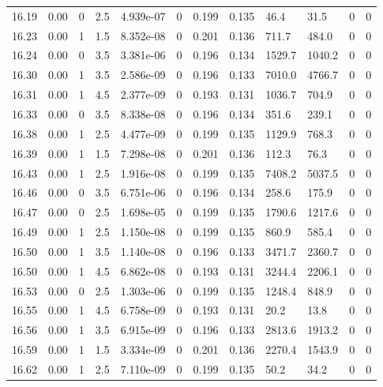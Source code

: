 \documentclass[preview]{standalone}
\begin{document}
{{{{{{{{{{{{{{{{{\begin{tabular}{L{1.2cm}C{1.2cm} C{0.3cm}C{0.5cm} C{1.4cm}C{1.4cm} C{1.4cm}C{1.4cm} C{1.6cm}C{1.6cm} C{1.6cm}C{1.6cm}}
  16.19  &  0.00  & 0     & 2.5 &  4.939e-07  & 0  &  0.199&   0.135& 46.4 & 31.5   &  0 & 0  \\ 
  16.23  &  0.00  & 1     & 1.5 &  8.352e-08  & 0  &  0.201&   0.136& 711.7 & 484.0   &  0 & 0  \\ 
  16.24  &  0.00  & 0     & 3.5 &  3.381e-06  & 0  &  0.196&   0.134& 1529.7 & 1040.2   &  0 & 0  \\ 
  16.30  &  0.00  & 1     & 3.5 &  2.586e-09  & 0  &  0.196&   0.133& 7010.0 & 4766.7   &  0 & 0  \\ 
  16.31  &  0.00  & 1     & 4.5 &  2.377e-09  & 0  &  0.193&   0.131& 1036.7 & 704.9   &  0 & 0  \\ 
  16.33  &  0.00  & 0     & 3.5 &  8.338e-08  & 0  &  0.196&   0.134& 351.6 & 239.1   &  0 & 0  \\ 
  16.38  &  0.00  & 1     & 2.5 &  4.477e-09  & 0  &  0.199&   0.135& 1129.9 & 768.3   &  0 & 0  \\ 
  16.39  &  0.00  & 1     & 1.5 &  7.298e-08  & 0  &  0.201&   0.136& 112.3 & 76.3   &  0 & 0  \\ 
  16.43  &  0.00  & 1     & 2.5 &  1.916e-08  & 0  &  0.199&   0.135& 7408.2 & 5037.5   &  0 & 0  \\ 
  16.46  &  0.00  & 0     & 3.5 &  6.751e-06  & 0  &  0.196&   0.134& 258.6 & 175.9   &  0 & 0  \\ 
  16.47  &  0.00  & 0     & 2.5 &  1.698e-05  & 0  &  0.199&   0.135& 1790.6 & 1217.6   &  0 & 0  \\ 
  16.49  &  0.00  & 1     & 2.5 &  1.150e-08  & 0  &  0.199&   0.135& 860.9 & 585.4   &  0 & 0  \\ 
  16.50  &  0.00  & 1     & 3.5 &  1.140e-08  & 0  &  0.196&   0.133& 3471.7 & 2360.7   &  0 & 0  \\ 
  16.50  &  0.00  & 1     & 4.5 &  6.862e-08  & 0  &  0.193&   0.131& 3244.4 & 2206.1   &  0 & 0  \\ 
  16.53  &  0.00  & 0     & 2.5 &  1.303e-06  & 0  &  0.199&   0.135& 1248.4 & 848.9   &  0 & 0  \\ 
  16.55  &  0.00  & 1     & 4.5 &  6.758e-09  & 0  &  0.193&   0.131& 20.2 & 13.8   &  0 & 0  \\ 
  16.56  &  0.00  & 1     & 3.5 &  6.915e-09  & 0  &  0.196&   0.133& 2813.6 & 1913.2   &  0 & 0  \\ 
  16.59  &  0.00  & 1     & 1.5 &  3.334e-09  & 0  &  0.201&   0.136& 2270.4 & 1543.9   &  0 & 0  \\ 
  16.62  &  0.00  & 1     & 2.5 &  7.110e-09  & 0  &  0.199&   0.135& 50.2 & 34.2   &  0 & 0  \\ 

\end{tabular}}}}}}}}}}}}}}}}}}
\end{document}

